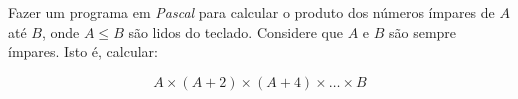 \item Fazer um programa em \emph{Pascal} para calcular
o produto dos números ímpares de $A$ até $B$,
onde $A \le B$ são lidos do teclado. Considere que $A$ e $B$ são
sempre ímpares. Isto é, calcular:

\[
A \times (A+2) \times (A+4) \times \ldots \times B
\]
